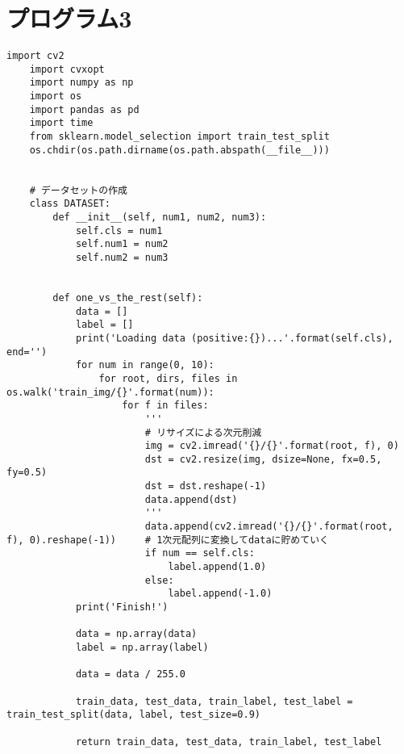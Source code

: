 \section{プログラム3}
\begin{lstlisting}[caption=課題2のMNISTの数字画像識別におけるSVM学習用プログラム]
    import cv2
    import cvxopt
    import numpy as np
    import os
    import pandas as pd
    import time
    from sklearn.model_selection import train_test_split
    os.chdir(os.path.dirname(os.path.abspath(__file__)))


    # データセットの作成
    class DATASET:
        def __init__(self, num1, num2, num3):
            self.cls = num1
            self.num1 = num2
            self.num2 = num3


        def one_vs_the_rest(self):
            data = []
            label = []
            print('Loading data (positive:{})...'.format(self.cls), end='')
            for num in range(0, 10):
                for root, dirs, files in os.walk('train_img/{}'.format(num)):
                    for f in files:
                        '''
                        # リサイズによる次元削減
                        img = cv2.imread('{}/{}'.format(root, f), 0)
                        dst = cv2.resize(img, dsize=None, fx=0.5, fy=0.5)
                        dst = dst.reshape(-1)
                        data.append(dst)
                        '''
                        data.append(cv2.imread('{}/{}'.format(root, f), 0).reshape(-1))     # 1次元配列に変換してdataに貯めていく
                        if num == self.cls:
                            label.append(1.0)
                        else:
                            label.append(-1.0)
            print('Finish!')
            
            data = np.array(data)
            label = np.array(label)

            data = data / 255.0

            train_data, test_data, train_label, test_label = train_test_split(data, label, test_size=0.9)
            
            return train_data, test_data, train_label, test_label



\end{lstlisting}
